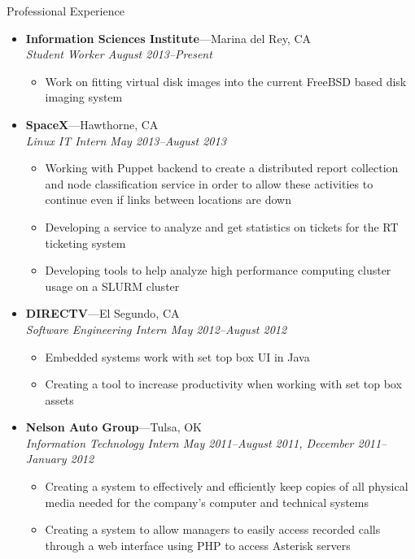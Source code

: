 \documentclass[8pt,oneside]{article}
\newenvironment{ressection}[1]{
	\vspace{4pt}
	{\fontfamily{phv}\selectfont\large#1}
	\begin{itemize}
	\vspace{3pt}
}{
	\end{itemize}
}
\newcommand{\ressubitem}[1]{
	\vspace{-1pt}
	\item \begin{flushleft} #1 \end{flushleft}
}
\newcommand{\resbigitem}[3]{
	\vspace{-5pt}
	\item
	\textbf{#1}---#2 \\
	\textit{#3}
}
\newenvironment{ressubsec}[3]{
	\resbigitem{#1}{#2}{#3}
	\vspace{-2pt}
	\begin{itemize}
}{
	\end{itemize}
}
\begin{document}
\begin{ressection}{Professional Experience}
        \begin{ressubsec}{Information Sciences Institute}{Marina del Rey, CA}{Student Worker August 2013--Present}
                \ressubitem{Work on fitting virtual disk images into the current FreeBSD based disk imaging system}
        \end{ressubsec}
        \begin{ressubsec}{SpaceX}{Hawthorne, CA}{Linux IT Intern May 2013--August 2013}
                \ressubitem{Working with Puppet backend to create a distributed report collection and node classification service in order to allow these activities to continue even if links between locations are down}
                \ressubitem{Developing a service to analyze and get statistics on tickets for the RT ticketing system}
                \ressubitem{Developing tools to help analyze high performance computing cluster usage on a SLURM cluster}
        \end{ressubsec}
	\begin{ressubsec}{DIRECTV}{El Segundo, CA}{Software Engineering Intern May 2012--August 2012}
		\ressubitem{Embedded systems work with set top box UI in Java}
		\ressubitem{Creating a tool to increase productivity when working with set top box assets}
	\end{ressubsec}
	\begin{ressubsec}{Nelson Auto Group}{Tulsa, OK}{Information Technology Intern May 2011--August 2011, December 2011--January 2012}
		\ressubitem{Creating a system to effectively and efficiently keep copies of all physical media needed for the company's computer and technical systems}
		\ressubitem{Creating a system to allow managers to easily access recorded calls through a web interface using PHP to access Asterisk servers}
	\end{ressubsec}

	
	\begin{comment}
	\begin{ressubsec}{Tulsa Day Center For the Homeless}{Tulsa, OK}{Volunteer:  July 2006--September 2009}
		\ressubitem{Worked mainly with individuals receiving tuberculosis tests.}
		\ressubitem{Entered tuberculosis data and kept computerized records between the Day Center for the Homeless and the Tulsa City-County Health Department up to date.}
	\end{ressubsec}
	\end{comment}

\end{ressection}
\end{document}
